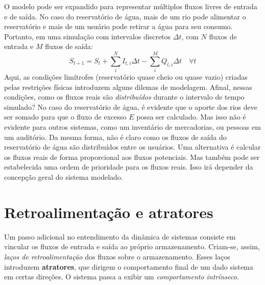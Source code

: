 \documentclass[./main.tex]{subfiles}
\begin{document}
\par O modelo pode ser expandido para representar múltiplos fluxos livres de entrada e de saída. No caso do reservatório de água, mais de um rio pode alimentar o reservatório e mais de um usuário pode retirar a água para seu consumo. Portanto, em uma simulação com intervalos discretos $\Delta t$, com $N$ fluxos de entrada e $M$ fluxos de saída:
\begin{equation} 
	\label{eq:sis_linear_numerics_expanded}
	S_{t+1} = S_{t} + \sum_{i}^{N} I_{t, i}\Delta t - \sum_{i}^{M}Q_{t, i}\Delta t \quad \forall t
\end{equation} 
Aqui, as condições limítrofes (reservatório quase cheio ou quase vazio) criadas pelas restrições físicas introduzem alguns dilemas de modelagem. Afinal, nessas condições, como os fluxos reais são \textit{distribuídos} durante o intervalo de tempo simulado? No caso do reservatório de água, é evidente que o aporte dos rios deve ser somado para que o fluxo de excesso $E$ possa ser calculado. Mas isso não é evidente para outros sistemas, como um inventário de mercadorias, ou pessoas em um auditório. Da mesma forma, não é claro como os fluxos de saída do reservatório de água são distribuídos entre os usuários. Uma alternativa é calcular os fluxos reais de forma proporcional aos fluxos potenciais. Mas também pode ser estabelecida uma ordem de prioridade para os fluxos reais. Isso irá depender da concepção geral do sistema modelado.
   
\section{Retroalimentação e atratores}   

\par Um passo adicional no entendimento da dinâmica de sistemas consiste em vincular os fluxos de entrada e saída ao próprio armazenamento. Criam-se, assim, \textit{laços de retroalimentação} dos fluxos sobre o armazenamento. Esses laços introduzem \textbf{atratores}, que dirigem o comportamento final de um dado sistema em certas direções. O sistema passa a exibir um \textit{comportamento intrínseco}. 
\end{document}
